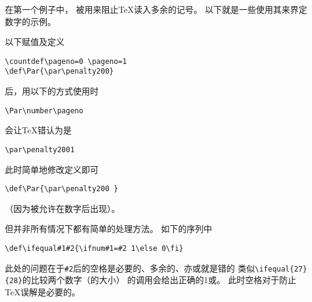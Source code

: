 \documentclass{book}
\begin{document}
在第一个例子中，
被用来阻止{\TeX}读入多余的记号。
以下就是一些使用其来界定数字的示例。

以下赋值及定义
\begin{verbatim}
\countdef\pageno=0 \pageno=1
\def\Par{\par\penalty200}
\end{verbatim}
后，用以下的方式使用时
\begin{verbatim}
\Par\number\pageno
\end{verbatim}
会让{\TeX}错认为是
\begin{verbatim}
\par\penalty2001
\end{verbatim}
此时简单地修改定义即可
\begin{verbatim}
\def\Par{\par\penalty200 }
\end{verbatim}
（因为被允许在数字后出现）。

但并非所有情况下都有简单的处理方法。
如下的序列中
\begin{verbatim}
\def\ifequal#1#2{\ifnum#1=#2 1\else 0\fi}
\end{verbatim}
此处的问题在于\verb-#2-后的空格是必要的、多余的、亦或就是错的
类似\verb-\ifequal{27}{28}-的比较两个数字（的大小）
的调用会给出正确的\n1或。
此时空格对于防止{\TeX}误解是必要的。
\end{document}
